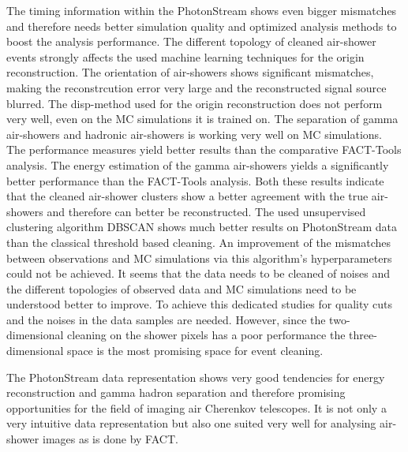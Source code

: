 The timing information within the PhotonStream shows even bigger mismatches and
therefore needs better simulation quality and optimized analysis methods to
boost the analysis performance. The different topology of cleaned air-shower
events strongly affects the used machine learning techniques for the origin
reconstruction. The orientation of air-showers shows significant mismatches,
making the reconstrcution error very large and the reconstructed signal source
blurred. The disp-method used for the origin reconstruction does not perform
very well, even on the MC simulations it is trained on. The separation of gamma
air-showers and hadronic air-showers is working very well on MC simulations.
The performance measures yield better results than the comparative FACT-Tools
analysis. The energy estimation of the gamma air-showers yields a significantly
better performance than the FACT-Tools analysis. Both these results indicate
that the cleaned air-shower clusters show a better agreement with the true air-
showers and therefore can better be reconstructed. The used unsupervised
clustering algorithm DBSCAN shows much better results on PhotonStream data than
the classical threshold based cleaning. An improvement of the mismatches
between observations and MC simulations via this algorithm's hyperparameters
could not be achieved. It seems that the data needs to be cleaned of noises and
the different topologies of observed data and MC simulations need to be
understood better to improve. To achieve this dedicated studies for quality
cuts and the noises in the data samples are needed. However, since the two-dimensional cleaning on the shower pixels has a poor performance the three-dimensional space is the most promising space for event cleaning.

The PhotonStream data representation shows very good tendencies for energy
reconstruction and gamma hadron separation and therefore promising
opportunities for the field of imaging air Cherenkov telescopes. It is not only
a very intuitive data representation but also one suited very well for
analysing air-shower images as is done by FACT.
